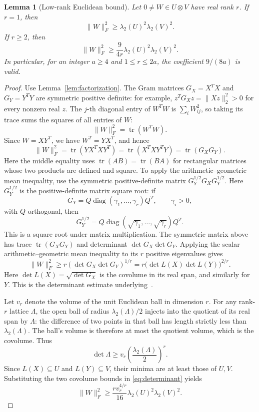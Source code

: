 \documentclass[11pt,letterpaper]{article}
\numberwithin{equation}{section}
\newtheorem{lemma}[theorem]{Lemma}
\theoremstyle{definition}
\theoremstyle{remark}
\DeclareMathOperator{\tr}{tr}
\DeclareMathOperator{\diag}{diag}
\begin{document}
\begin{lemma}[Low-rank Euclidean bound]\label{lem:lowrank}
Let $0\ne W\in U\otimes V$ have real rank $r$. If $r=1$, then
\[
 \|W\|_F^2\ge\lambda_2(U)^2\lambda_2(V)^2.
\]
If $r\ge2$, then
\begin{equation}\label{eq:lowrank}
 \|W\|_F^2\ge\frac9{4r}\lambda_2(U)^2\lambda_2(V)^2.
\end{equation}
In particular, for an integer $a\ge4$ and $1\le r\le2a$, the coefficient $9/(8a)$ is valid.
\end{lemma}
\begin{proof}
Use Lemma~\ref{lem:factorization}. The Gram matrices $G_X=X^TX$ and $G_Y=Y^TY$ are symmetric positive definite: for example, $z^TG_Xz=\|Xz\|_2^2>0$ for every nonzero real $z$. The $j$-th diagonal entry of $W^TW$ is $\sum_i W_{ij}^2$, so taking its trace sums the squares of all entries of $W$:
\[
 \|W\|_F^2=\tr(W^TW).
\]
Since $W=XY^T$, we have $W^T=YX^T$, and hence
\[
 \|W\|_F^2=\tr(YX^TXY^T)
 =\tr(X^TXY^TY)=\tr(G_XG_Y).
\]
Here the middle equality uses $\tr(AB)=\tr(BA)$ for rectangular matrices whose two products are defined and square.
To apply the arithmetic--geometric mean inequality, use the symmetric positive-definite matrix $G_Y^{1/2}G_XG_Y^{1/2}$. Here $G_Y^{1/2}$ is the positive-definite matrix square root: if
\[
 G_Y=Q\diag(\gamma_1,\ldots,\gamma_r)Q^T,\qquad\gamma_i>0,
\]
with $Q$ orthogonal, then
\[
 G_Y^{1/2}=Q\diag(\sqrt{\gamma_1},\ldots,\sqrt{\gamma_r})Q^T.
\]
This is a square root under matrix multiplication. The symmetric matrix above has trace $\tr(G_XG_Y)$ and determinant $\det G_X\det G_Y$. Applying the scalar arithmetic--geometric mean inequality to its $r$ positive eigenvalues gives
\begin{equation}\label{eq:determinant}
 \|W\|_F^2\ge r(\det G_X\det G_Y)^{1/r}
 =r\bigl(\det L(X)\det L(Y)\bigr)^{2/r}.
\end{equation}
Here $\det L(X)=\sqrt{\det G_X}$ is the covolume in its real span, and similarly for $Y$. This is the determinant estimate underlying~\cite[Claim 3.6]{hr}.

Let $v_r$ denote the volume of the unit Euclidean ball in dimension $r$. For any rank-$r$ lattice $\Lambda$, the open ball of radius $\lambda_2(\Lambda)/2$ injects into the quotient of its real span by $\Lambda$: the difference of two points in that ball has length strictly less than $\lambda_2(\Lambda)$. The ball's volume is therefore at most the quotient volume, which is the covolume. Thus
\[
 \det\Lambda\ge v_r\left(\frac{\lambda_2(\Lambda)}2\right)^r.
\]
Since $L(X)\subseteq U$ and $L(Y)\subseteq V$, their minima are at least those of $U,V$. Substituting the two covolume bounds in \eqref{eq:determinant} yields
\begin{equation}\label{eq:ball-bound}
 \|W\|_F^2\ge\frac{r v_r^{4/r}}{16}
                    \lambda_2(U)^2\lambda_2(V)^2.
\end{equation}


\end{proof}
\end{document}
